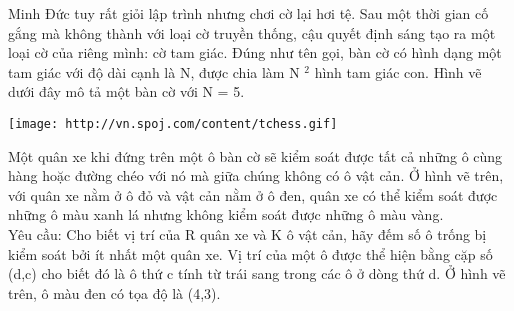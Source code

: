 Minh Đức tuy rất giỏi lập trình nhưng chơi cờ lại hơi tệ. Sau một thời gian cố gắng mà không thành với loại cờ truyền thống, cậu quyết định sáng tạo ra một loại cờ của riêng mình: cờ tam giác. Đúng như tên gọi, bàn cờ có hình dạng một tam giác với độ dài cạnh là N, được chia làm N   $^    2   $   hình tam giác con. Hình vẽ dưới đây mô tả một bàn cờ với N = 5.  


\texttt{[image: http://vn.spoj.com/content/tchess.gif]}

   Một quân xe khi đứng trên một ô bàn cờ sẽ kiểm soát được tất cả những ô cùng hàng hoặc đường chéo với nó mà giữa chúng không có ô vật cản. Ở hình vẽ trên, với quân xe nằm ở ô đỏ và vật cản nằm ở ô đen, quân xe có thể kiểm soát được những ô màu xanh lá nhưng không kiểm soát được những ô màu vàng.   
\\   Yêu cầu: Cho biết vị trí của R quân xe và K ô vật cản, hãy đếm số ô trống bị kiểm soát bởi ít nhất một quân xe. Vị trí của một ô được thể hiện bằng cặp số (d,c) cho biết đó là ô thứ c tính từ trái sang trong các ô ở dòng thứ d. Ở hình vẽ trên, ô màu đen có tọa độ là (4,3).  

\
